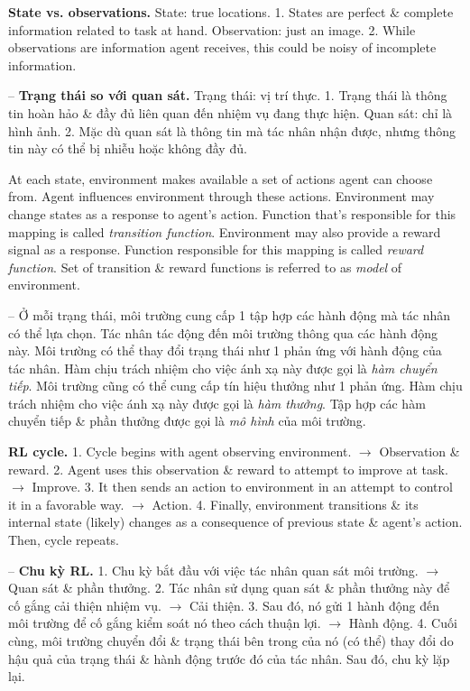 \documentclass{article}
\begin{document}
\begin{itemize}
\begin{itemize}
\begin{itemize}
            {\bf State vs. observations.} State: true locations. 1. States are perfect \& complete information related to task at hand. Observation: just an image. 2. While observations are information agent receives, this could be noisy of incomplete information.

            -- {\bf Trạng thái so với quan sát.} Trạng thái: vị trí thực. 1. Trạng thái là thông tin hoàn hảo \& đầy đủ liên quan đến nhiệm vụ đang thực hiện. Quan sát: chỉ là hình ảnh. 2. Mặc dù quan sát là thông tin mà tác nhân nhận được, nhưng thông tin này có thể bị nhiễu hoặc không đầy đủ.

            At each state, environment makes available a set of actions agent can choose from. Agent influences environment through these actions. Environment may change states as a response to agent's action. Function that's responsible for this mapping is called {\it transition function}. Environment may also provide a reward signal as a response. Function responsible for this mapping is called {\it reward function}. Set of transition \& reward functions is referred to as {\it model} of environment.

            -- Ở mỗi trạng thái, môi trường cung cấp 1 tập hợp các hành động mà tác nhân có thể lựa chọn. Tác nhân tác động đến môi trường thông qua các hành động này. Môi trường có thể thay đổi trạng thái như 1 phản ứng với hành động của tác nhân. Hàm chịu trách nhiệm cho việc ánh xạ này được gọi là {\it hàm chuyển tiếp}. Môi trường cũng có thể cung cấp tín hiệu thưởng như 1 phản ứng. Hàm chịu trách nhiệm cho việc ánh xạ này được gọi là {\it hàm thưởng}. Tập hợp các hàm chuyển tiếp \& phần thưởng được gọi là {\it mô hình} của môi trường.

            {\bf RL cycle.} 1. Cycle begins with agent observing environment. $\to$ Observation \& reward. 2. Agent uses this observation \& reward to attempt to improve at task. $\to$ Improve. 3. It then sends an action to environment in an attempt to control it in a favorable way. $\to$ Action. 4. Finally, environment transitions \& its internal state (likely) changes as a consequence of previous state \& agent's action. Then, cycle repeats.

            -- {\bf Chu kỳ RL.} 1. Chu kỳ bắt đầu với việc tác nhân quan sát môi trường. $\to$ Quan sát \& phần thưởng. 2. Tác nhân sử dụng quan sát \& phần thưởng này để cố gắng cải thiện nhiệm vụ. $\to$ Cải thiện. 3. Sau đó, nó gửi 1 hành động đến môi trường để cố gắng kiểm soát nó theo cách thuận lợi. $\to$ Hành động. 4. Cuối cùng, môi trường chuyển đổi \& trạng thái bên trong của nó (có thể) thay đổi do hậu quả của trạng thái \& hành động trước đó của tác nhân. Sau đó, chu kỳ lặp lại.


\end{itemize}
\end{itemize}
\end{itemize}
\end{document}
